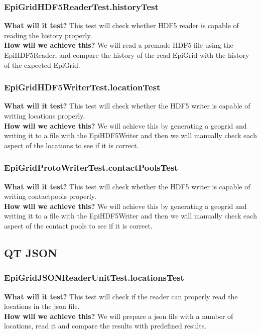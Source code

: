 \documentclass{article}
\begin{document}
\subsubsection{EpiGridHDF5ReaderTest.historyTest} 
\textbf{What will it test?} 
This test will check whether HDF5 reader is capable of reading the history properly. \\
\newline
\textbf{How will we achieve this?} 
We will read a premade HDF5 file using the EpiHDF5Reader, and compare the history of the read EpiGrid with the history of the expected EpiGrid.
\subsubsection{EpiGridHDF5WriterTest.locationTest} 
\textbf{What will it test?} 
This test will check whether the HDF5 writer is capable of writing locations properly. \\
\newline
\textbf{How will we achieve this?} 
We will achieve this by generating a geogrid and writing it to a file with the EpiHDF5Writer and then we will manually check each aspect of the locations to see if it is correct.
\subsubsection{EpiGridProtoWriterTest.contactPoolsTest} 
\textbf{What will it test?} 
This test will check whether the HDF5 writer is capable of writing contactpools properly. \\
\newline
\textbf{How will we achieve this?} 
We will achieve this by generating a geogrid and writing it to a file with the EpiHDF5Writer and then we will manually check each aspect of the contact pools to see if it is correct.

\subsection{QT JSON}
\subsubsection{EpiGridJSONReaderUnitTest.locationsTest}
\textbf{What will it test?} 
This test will check if the reader can properly read the locations in the json file. \\
\newline
\textbf{How will we achieve this?} 
We will prepare a json file with a number of locations, read it and compare the results with predefined results.
\end{document}
